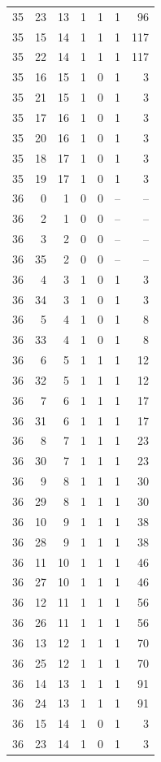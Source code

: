 \begin{longtable}{rrrrrrr}
35 & 23 & 13 & 1 & 1 & 1 & 96\\
35 & 15 & 14 & 1 & 1 & 1 & 117\\
35 & 22 & 14 & 1 & 1 & 1 & 117\\
35 & 16 & 15 & 1 & 0 & 1 & 3\\
35 & 21 & 15 & 1 & 0 & 1 & 3\\
35 & 17 & 16 & 1 & 0 & 1 & 3\\
35 & 20 & 16 & 1 & 0 & 1 & 3\\
35 & 18 & 17 & 1 & 0 & 1 & 3\\
35 & 19 & 17 & 1 & 0 & 1 & 3\\
36 & 0 & 1 & 0 & 0 & -- & --\\
36 & 2 & 1 & 0 & 0 & -- & --\\
36 & 3 & 2 & 0 & 0 & -- & --\\
36 & 35 & 2 & 0 & 0 & -- & --\\
36 & 4 & 3 & 1 & 0 & 1 & 3\\
36 & 34 & 3 & 1 & 0 & 1 & 3\\
36 & 5 & 4 & 1 & 0 & 1 & 8\\
36 & 33 & 4 & 1 & 0 & 1 & 8\\
36 & 6 & 5 & 1 & 1 & 1 & 12\\
36 & 32 & 5 & 1 & 1 & 1 & 12\\
36 & 7 & 6 & 1 & 1 & 1 & 17\\
36 & 31 & 6 & 1 & 1 & 1 & 17\\
36 & 8 & 7 & 1 & 1 & 1 & 23\\
36 & 30 & 7 & 1 & 1 & 1 & 23\\
36 & 9 & 8 & 1 & 1 & 1 & 30\\
36 & 29 & 8 & 1 & 1 & 1 & 30\\
36 & 10 & 9 & 1 & 1 & 1 & 38\\
36 & 28 & 9 & 1 & 1 & 1 & 38\\
36 & 11 & 10 & 1 & 1 & 1 & 46\\
36 & 27 & 10 & 1 & 1 & 1 & 46\\
36 & 12 & 11 & 1 & 1 & 1 & 56\\
36 & 26 & 11 & 1 & 1 & 1 & 56\\
36 & 13 & 12 & 1 & 1 & 1 & 70\\
36 & 25 & 12 & 1 & 1 & 1 & 70\\
36 & 14 & 13 & 1 & 1 & 1 & 91\\
36 & 24 & 13 & 1 & 1 & 1 & 91\\
36 & 15 & 14 & 1 & 0 & 1 & 3\\
36 & 23 & 14 & 1 & 0 & 1 & 3\\

\end{longtable}
